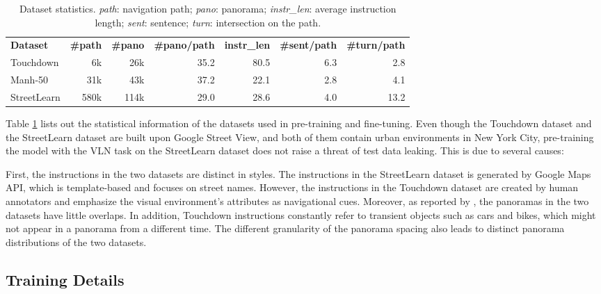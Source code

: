 \documentclass[11pt,a4paper]{article}
\begin{document}
\begin{table}[h]
\setlength{\tabcolsep}{3pt}
\small
\begin{adjustbox}{width=\linewidth,center}
\begin{tabular}{l r r r r r r}
\cmidrule[\heavyrulewidth]{1-7}
\textbf{Dataset} & \textbf{\#path}   & \textbf{\#pano} &  \textbf{\#pano/path}  & \textbf{instr\_len} & \textbf{\#sent/path} & \textbf{\#turn/path} \\ \cmidrule{1-7}
Touchdown        & 6k  & 26k & 35.2 & 80.5 & 6.3 & 2.8  \\ \cmidrule{1-7}
Manh-50         & 31k  & 43k & 37.2 & 22.1 & 2.8 & 4.1  \\ \cmidrule{1-7}
StreetLearn      & 580k   & 114k & 29.0    & 28.6  & 4.0    & 13.2  \\ 
\cmidrule[\heavyrulewidth]{1-7}
\end{tabular}
\end{adjustbox}
\caption{Dataset statistics. \emph{path}: navigation path; \emph{pano}: panorama; \emph{instr\_len}: average instruction length; \emph{sent}: sentence; \emph{turn}: intersection on the path. 
}
\label{tab:dataset_details}
\end{table}

 Table \ref{tab:dataset_details} lists out the statistical information of the datasets used in pre-training and fine-tuning.
Even though the Touchdown dataset and the StreetLearn dataset are built upon Google Street View, and both of them contain urban environments in New York City, pre-training the model with the VLN task on the StreetLearn dataset does not raise a threat of test data leaking. This is due to several causes: 

First, the instructions in the two datasets are distinct in styles. The instructions in the StreetLearn dataset is generated by Google Maps API, which is template-based and focuses on street names. However, the instructions in the Touchdown dataset are created by human annotators and emphasize the visual environment's attributes as navigational cues. Moreover, as reported by \citet{mehta2020retouchdown}, the panoramas in the two datasets have little overlaps. In addition, Touchdown instructions constantly refer to transient objects such as cars and bikes, which might not appear in a panorama from a different time. The different granularity of the panorama spacing also leads to distinct panorama distributions of the two datasets.


\subsection{Training Details}
\end{document}
